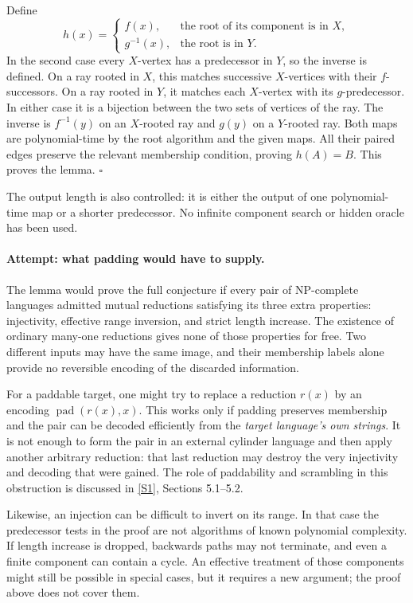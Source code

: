 \documentclass[11pt,a4paper]{article}
\newcommand{\sref}[2]{\hyperlink{source:#1:#2}{[S#2]}}
\numberwithin{equation}{section}
\begin{document}
Define
\begin{equation}\label{eq175-h}
 h(x)=\begin{cases}
       f(x),&\text{the root of its component is in }X,\\
       g^{-1}(x),&\text{the root is in }Y.
      \end{cases}
\end{equation}
In the second case every $X$-vertex has a predecessor in $Y$, so the
inverse is defined. On a ray rooted in $X$, this matches successive
$X$-vertices with their $f$-successors. On a ray rooted in $Y$, it matches
each $X$-vertex with its $g$-predecessor. In either case it is a bijection
between the two sets of vertices of the ray. The inverse is
$f^{-1}(y)$ on an $X$-rooted ray and $g(y)$ on a $Y$-rooted ray.
Both maps are polynomial-time by the root algorithm and the given maps.
All their paired edges preserve the relevant membership condition, proving
$h(A)=B$. This proves the lemma. \hfill$\square$

The output length is also controlled: it is either the output of one
polynomial-time map or a shorter predecessor. No infinite component search
or hidden oracle has been used.

\paragraph{Attempt: what padding would have to supply.}
The lemma would prove the full conjecture if every pair of NP-complete
languages admitted mutual reductions satisfying its three extra properties:
injectivity, effective range inversion, and strict length increase. The
existence of ordinary many-one reductions gives none of those properties
for free. Two different inputs may have the same image, and their membership
labels alone provide no reversible encoding of the discarded information.

For a paddable target, one might try to replace a reduction $r(x)$ by an
encoding $\operatorname{pad}(r(x),x)$. This works only if padding preserves
membership and the pair can be decoded efficiently from the \emph{target
language's own strings}. It is not enough to form the pair in an external
cylinder language and then apply another arbitrary reduction: that last
reduction may destroy the very injectivity and decoding that were gained.
The role of paddability and scrambling in this obstruction is discussed in
\sref{175}{1}, Sections 5.1--5.2.

Likewise, an injection can be difficult to invert on its range. In that
case the predecessor tests in the proof are not algorithms of known
polynomial complexity. If length increase is dropped, backwards paths
may not terminate, and even a finite component can contain a cycle.
An effective treatment of those components might still be possible in
special cases, but it requires a new argument; the proof above does not
cover them.
\end{document}
